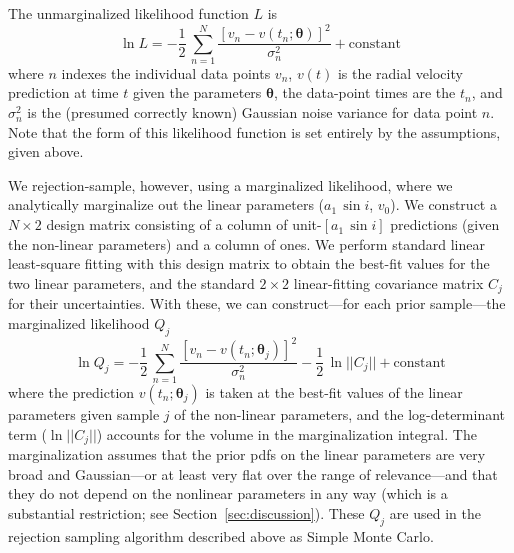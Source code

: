 \documentclass[manuscript, letterpaper]{aastex6}
\newcommand{\sectionname}{Section}
\newcommand{\asini}{\ensuremath{a_1\,\sin i}}
\newcommand{\bs}[1]{\boldsymbol{#1}}
\begin{document}
The unmarginalized likelihood function $L$ is
\begin{equation}
\ln L = -\frac{1}{2}\,\sum_{n=1}^N \frac{[v_n - v(t_n;\bs{\theta})]^2}{\sigma_n^2}
 + \mathrm{constant}
\end{equation}
where $n$ indexes the individual data points $v_n$, $v(t)$ is the
radial velocity prediction at time $t$ given the parameters $\bs{\theta}$, the
data-point times are the $t_n$, and $\sigma_n^2$ is the (presumed
correctly known) Gaussian noise variance for data point $n$.
Note that the form of this likelihood function is set entirely by
the assumptions, given above.

We rejection-sample, however, using a marginalized likelihood, where
we analytically marginalize out the linear parameters ($\asini$,
$v_0$).
We construct a $N\times 2$ design matrix consisting of a column of
unit-$[\asini]$ predictions (given the non-linear parameters) and a
column of ones.
We perform standard linear least-square fitting with this design
matrix to obtain the best-fit values for the two linear parameters,
and the standard $2\times 2$ linear-fitting covariance matrix $C_j$ for their
uncertainties.
With these, we can construct---for each prior sample---the marginalized
likelihood $Q_j$
\begin{equation}
\ln Q_j = -\frac{1}{2}\,\sum_{n=1}^N \frac{[v_n - v(t_n;\bs{\theta}_j)]^2}{\sigma_n^2} -\frac{1}{2}\,\ln ||C_j||
 + \mathrm{constant}
\end{equation}
where the prediction $v(t_n;\bs{\theta}_j)$ is taken at the best-fit values of
the linear parameters given sample $j$ of the non-linear parameters, and the
log-determinant term ($\ln ||C_j||$) accounts for the volume in the
marginalization integral.
The marginalization assumes that the prior pdfs on the linear parameters
are very broad and Gaussian---or
at least very flat over the range of relevance---and that they do not depend
on the nonlinear parameters in any way (which is a substantial restriction;
see \sectionname~\ref{sec:discussion}).
These $Q_j$ are used in the rejection sampling algorithm described above
as Simple Monte Carlo.
\end{document}
